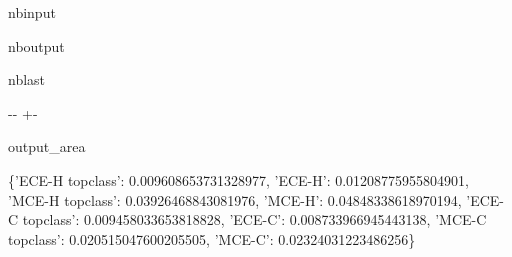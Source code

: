\documentclass[letterpaper,10pt,english]{sphinxmanual}
\begin{document}
\begin{sphinxuseclass}{nbinput}
{
\begin{sphinxVerbatim}[commandchars=\\\{\}]
\llap{\color{nbsphinxin}[4]:\,\hspace{\fboxrule}\hspace{\fboxsep}}   
  
  \PYG{p}{[}   \PYG{p}{]}
\end{sphinxVerbatim}
}

\end{sphinxuseclass}
\begin{sphinxuseclass}{nboutput}
\begin{sphinxuseclass}{nblast}
{

\kern-\sphinxverbatimsmallskipamount\kern-\baselineskip
\kern+\FrameHeightAdjust\kern-\fboxrule
\vspace{\nbsphinxcodecellspacing}

\begin{sphinxuseclass}{output_area}
\begin{sphinxuseclass}{}


\begin{sphinxVerbatim}[commandchars=\\\{\}]
\llap{\color{nbsphinxout}[4]:\,\hspace{\fboxrule}\hspace{\fboxsep}}\{'ECE-H topclass': 0.009608653731328977,
 'ECE-H': 0.01208775955804901,
 'MCE-H topclass': 0.03926468843081976,
 'MCE-H': 0.04848338618970194,
 'ECE-C topclass': 0.009458033653818828,
 'ECE-C': 0.008733966945443138,
 'MCE-C topclass': 0.020515047600205505,
 'MCE-C': 0.02324031223486256\}
\end{sphinxVerbatim}



\end{sphinxuseclass}
\end{sphinxuseclass}
}

\end{sphinxuseclass}
\end{sphinxuseclass}
\end{document}
